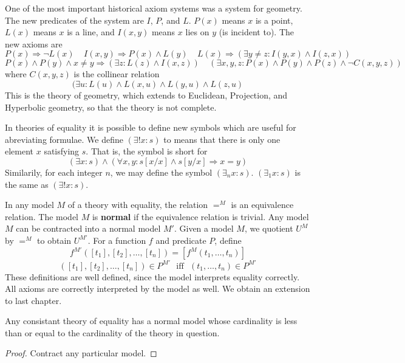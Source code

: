 \begin{example}
    One of the most important historical axiom systems was a system for geometry. The new predicates of the system are $I$, $P$, and $L$. $P(x)$ means $x$ is a point, $L(x)$ means $x$ is a line, and $I(x,y)$ means $x$ lies on $y$ (is incident to). The new axioms are
    \[ P(x) \Rightarrow \neg L(x)\ \ \ \ \ I(x,y) \Rightarrow P(x) \wedge L(y)\ \ \ \ \ L(x) \Rightarrow (\exists y \neq z: I(y,x) \wedge I(z,x)) \]
    \[ P(x) \wedge P(y) \wedge x \neq y \Rightarrow (\exists z: L(z) \wedge I(x,z))\ \ \ \ \ (\exists x,y,z: P(x) \wedge P(y) \wedge P(z) \wedge \neg C(x,y,z)) \]
    where $C(x,y,z)$ is the collinear relation
    \[ (\exists u: L(u) \wedge L(x,u) \wedge L(y,u) \wedge L(z,u) \]
    This is the theory of geometry, which extends to Euclidean, Projection, and Hyperbolic geometry, so that the theory is not complete.
\end{example}

In theories of equality it is possible to define new symbols which are useful for abreviating formulae. We define $(\exists ! x: s)$ to means that there is only one element $x$ satisfying $s$. That is, the symbol is short for
%
\[ (\exists x: s) \wedge (\forall x,y: s[x/x] \wedge s[y/x] \Rightarrow x = y) \]
%
Similarily, for each integer $n$, we may define the symbol $(\exists_n x: s)$. $(\exists_1 x: s)$ is the same as $(\exists ! x: s)$.

In any model $M$ of a theory with equality, the relation $=^M$ is an equivalence relation. The model $M$ is {\bf normal} if the equivalence relation is trivial. Any model $M$ can be contracted into a normal model $M'$. Given a model $M$, we quotient $U^M$ by $=^M$ to obtain $U^{M'}$. For a function $f$ and predicate $P$, define
%
\[ f^{M'}([t_1],[t_2],\dots,[t_n]) = [f^M(t_1, \dots, t_n)] \]
%
\[ ([t_1],[t_2],\dots,[t_n]) \in P^{M'}\ \ \ \text{iff}\ \ \ (t_1, \dots, t_n) \in P^{M'} \]
%
These definitions are well defined, since the model interprets equality correctly. All axioms are correctly interpreted by the model as well. We obtain an extension to last chapter.

\begin{prop}
    Any consistant theory of equality has a normal model whose cardinality is less than or equal to the cardinality of the theory in question.
\end{prop}
\begin{proof}
    Contract any particular model.
\end{proof}

